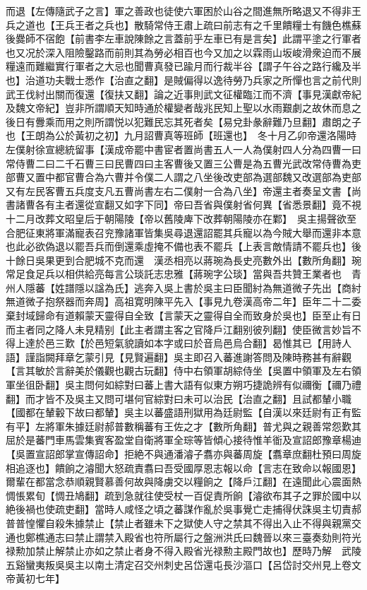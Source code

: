 而退【左傳隨武子之言】軍之善政也徒使六軍困於山谷之間進無所略退又不得非王兵之道也【王兵王者之兵也】散騎常侍王肅上疏曰前志有之千里饋糧士有饑色樵蘇後爨師不宿飽【前書李左車說陳餘之言蓋前乎左車已有是言矣】此謂平塗之行軍者也又况於深入阻險鑿路而前則其為勞必相百也今又加之以霖雨山坂峻滑衆迫而不展糧遠而難繼實行軍者之大忌也聞曹真發已踰月而行裁半谷【謂子午谷之路行纔及半也】治道功夫戰士悉作【治直之翻】是賊偏得以逸待勞乃兵家之所憚也言之前代則武王伐紂出關而復還【復扶又翻】論之近事則武文征權臨江而不濟【事見漢獻帝紀及魏文帝紀】豈非所謂順天知時通於權變者哉兆民知上聖以水雨艱劇之故休而息之後日有釁乘而用之則所謂悦以犯難民忘其死者矣【易兌卦彖辭難乃旦翻】肅朗之子也【王朗為公於黃初之初】九月詔曹真等班師【班還也】　冬十月乙卯帝還洛陽時左僕射徐宣總統留事【漢成帝罷中書宦者置尚書五人一人為僕射四人分為四曹一曰常侍曹二曰二千石曹三曰民曹四曰主客曹後又置三公曹是為五曹光武改常侍曹為吏部曹又置中都官曹合為六曹并令僕二人謂之八坐後改吏部為選部魏又改選部為吏部又有左民客曹五兵度支凡五曹尚書左右二僕射一合為八坐】帝還主者奏呈文書【尚書諸曹各有主者還從宣翻又如字下同】帝曰吾省與僕射省何異【省悉景翻】竟不視　十二月改葬文昭皇后于朝陽陵【帝以舊陵庳下改葬朝陽陵亦在鄴】　吳主揚聲欲至合肥征東將軍滿寵表召兖豫諸軍皆集吳尋退還詔罷其兵寵以為今賊大舉而還非本意也此必欲偽退以罷吾兵而倒還乘虛掩不備也表不罷兵【上表言敵情請不罷兵也】後十餘日吳果更到合肥城不克而還　漢丞相亮以蔣琬為長史亮數外出【數所角翻】琬常足食足兵以相供給亮每言公琰託志忠雅【蔣琬字公琰】當與吾共贊王業者也　青州人隱蕃【姓譜隱以諡為氏】逃奔入吳上書於吳主曰臣聞紂為無道微子先出【商紂無道微子抱祭器而奔周】高祖寛明陳平先入【事見九卷漢高帝二年】臣年二十二委棄封域歸命有道賴蒙天靈得自全致【言蒙天之靈得自全而致身於吳也】臣至止有日而主者同之降人未見精别【此主者謂主客之官降戶江翻别彼列翻】使臣微言妙旨不得上達於邑三歎【於邑短氣貌讀如本字或曰於音烏邑烏合翻】曷惟其已【用詩人語】謹詣闕拜章乞蒙引見【見賢遍翻】吳主即召入蕃進謝答問及陳時務甚有辭觀【言其敏於言辭美於儀觀也觀古玩翻】侍中右領軍胡綜侍坐【吳置中領軍及左右領軍坐徂卧翻】吳主問何如綜對曰蕃上書大語有似東方朔巧捷詭辨有似禰衡【禰乃禮翻】而才皆不及吳主又問可堪何官綜對曰未可以治民【治直之翻】且試都輦小職【國都在輦轂下故曰都輦】吳主以蕃盛語刑獄用為廷尉監【自漢以來廷尉有正有監有平】左將軍朱據廷尉郝普數稱蕃有王佐之才【數所角翻】普尤與之親善常怨歎其屈於是蕃門車馬雲集賓客盈堂自衛將軍全琮等皆傾心接待惟羊衜及宣詔郎豫章楊迪【吳置宣詔郎掌宣傳詔命】拒絶不與通潘濬子翥亦與蕃周旋【翥章庶翻杜預曰周旋相追逐也】饋餉之濬聞大怒疏責翥曰吾受國厚恩志報以命【言志在致命以報國恩】爾輩在都當念恭順親賢慕善何故與降虜交以糧餉之【降戶江翻】在遠聞此心震面熱惆悵累旬【惆丑鳩翻】疏到急就往使受杖一百促責所餉【濬欲布其子之罪於國中以絶後禍也使疏吏翻】當時人咸怪之頃之蕃謀作亂於吳事覺亡走捕得伏誅吳主切責郝普普惶懼自殺朱據禁止【禁止者雖未下之獄使人守之禁其不得出入止不得與親黨交通也鄭樵通志曰禁止謂禁入殿省也符所屬行之盤洲洪氏曰魏晉以來三臺奏劾則符光禄勲加禁止解禁止亦如之禁止者身不得入殿省光禄勲主殿門故也】歷時乃解　武陵五谿蠻夷叛吳吳主以南土清定召交州刺史呂岱還屯長沙漚口【呂岱討交州見上卷文帝黃初七年】

